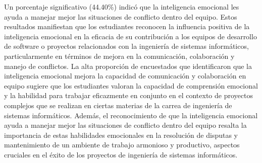 \documentclass[journal]{IEEEtran}
\begin{document}
\begin{enumerate}
{Un porcentaje significativo (44.40\%) indicó que la inteligencia emocional les ayuda a manejar mejor las situaciones de conflicto dentro del equipo.
Estos resultados manifiestan que los estudiantes reconocen la influencia positiva de la inteligencia emocional en la eficacia de su contribución a los equipos de desarrollo de software o proyectos relacionados con la ingeniería de sistemas informáticos, particularmente en términos de mejora en la comunicación, colaboración y manejo de conflictos.
La alta proporción de encuestados que identificaron que la inteligencia emocional mejora la capacidad de comunicación y colaboración en equipo sugiere que los estudiantes valoran la capacidad de comprensión emocional y la habilidad para trabajar eficazmente en conjunto en el contexto de proyectos complejos que se realizan en ciertas materias de la carrea de ingeniería de sistemas informáticos.
Además, el reconocimiento de que la inteligencia emocional ayuda a manejar mejor las situaciones de conflicto dentro del equipo resalta la importancia de estas habilidades emocionales en la resolución de disputas y mantenimiento de un ambiente de trabajo armonioso y productivo, aspectos cruciales en el éxito de los proyectos de ingeniería de sistemas informáticos.
}\\


\end{enumerate}
\end{document}
